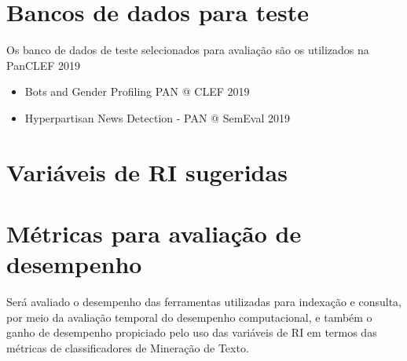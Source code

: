 \section{Bancos de dados para teste}  \label{sec:Bancos-de-dados-para-teste}
    Os banco de dados de teste selecionados para avaliação são os utilizados na PanCLEF 2019 %

    \begin{itemize}
        \item Bots and Gender Profiling PAN @ CLEF 2019
        \item Hyperpartisan News Detection - PAN @ SemEval 2019
    \end{itemize}
 



\section{Variáveis de RI sugeridas}  \label{sec:Variáveis-de-RI-sugeridas}
    



\section{Métricas para avaliação de desempenho}  \label{sec:Métricas-para-avaliação-de-desempenho}
    Será avaliado o desempenho das ferramentas utilizadas para indexação e consulta, por meio da avaliação temporal do desempenho computacional, e também o ganho de desempenho propiciado pelo uso das variáveis de RI em termos das métricas de classificadores de Mineração de Texto. %
    
